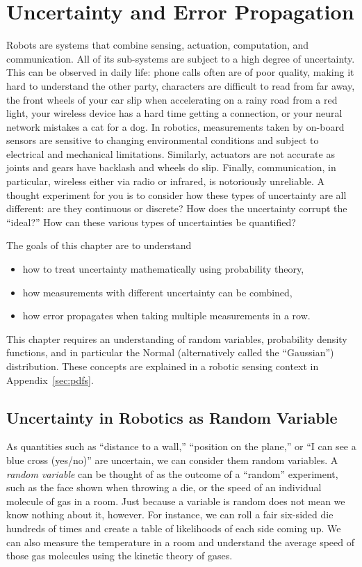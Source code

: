 \chapter{Uncertainty and Error Propagation}\label{chap:uncertainty}

Robots are systems that combine sensing, actuation, computation, and communication. All of its sub-systems are subject to a high degree
of uncertainty. This can be observed in daily life: phone calls often are of poor quality, making it hard to understand the other party,
characters are difficult to read from far away,  the front wheels of your car slip when accelerating on a rainy road from a red light,
your wireless device has a hard time getting a connection, or your neural network mistakes a cat for a dog. In robotics, measurements
taken by on-board sensors are sensitive to changing environmental conditions and subject to electrical and mechanical limitations.
Similarly, actuators are not accurate as joints and gears have backlash and wheels do slip. Finally, communication, in particular,
wireless either via radio or infrared, is notoriously unreliable. A thought experiment for you is to consider how these types of
uncertainty are all different: are they continuous or discrete? How does the uncertainty corrupt the ``ideal?'' How can these various
types of uncertainties be quantified?

The goals of this chapter are to understand
\begin{itemize}
    \item how to treat uncertainty mathematically using probability theory,
    \item how measurements with different uncertainty can be combined,
    \item how error propagates when taking multiple measurements in a row.
\end{itemize}

This chapter requires an understanding of random variables, probability density functions, and in particular the Normal
(alternatively called the ``Gaussian'') distribution. These concepts are explained in a robotic sensing context in Appendix~\ref{sec:pdfs}.

\section{Uncertainty in Robotics as Random Variable}

As quantities such as ``distance to a wall,'' ``position on the plane,'' or ``I can see a blue cross (yes/no)'' are uncertain, we can
consider them random variables. A \textsl{random variable} can be thought of as the outcome of a ``random''
experiment, such as the face shown when throwing a die, or the speed of an individual molecule of gas in a room. Just because a
variable is random does not mean we know nothing about it, however. For instance, we can roll a fair six-sided die hundreds of times
and create a table of likelihoods of each side coming up. We can also measure the temperature in a room and understand the
average speed of those gas molecules using the kinetic theory of gases.


